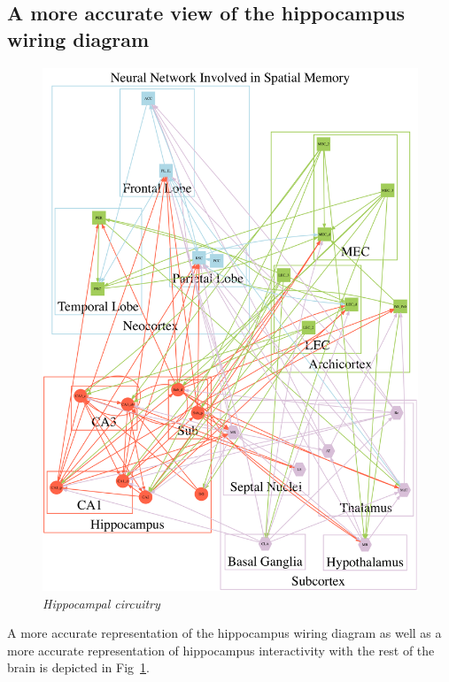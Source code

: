 \documentclass[doc, longtable]{apa6}
\begin{document}
\subsection{A more accurate view of the hippocampus wiring diagram}

\begin{figure}[htp!]
\includegraphics[width=.99\textwidth]{Complicated.png}
\centering
\begin{singlespace}
\caption{\textit{Hippocampal circuitry}}
\label{fig3}
\end{singlespace}
\end{figure}


A more accurate representation of the hippocampus wiring diagram as well as a more accurate representation of hippocampus interactivity with the rest of the brain is depicted in Fig~\ref{fig3}.
\end{document}

